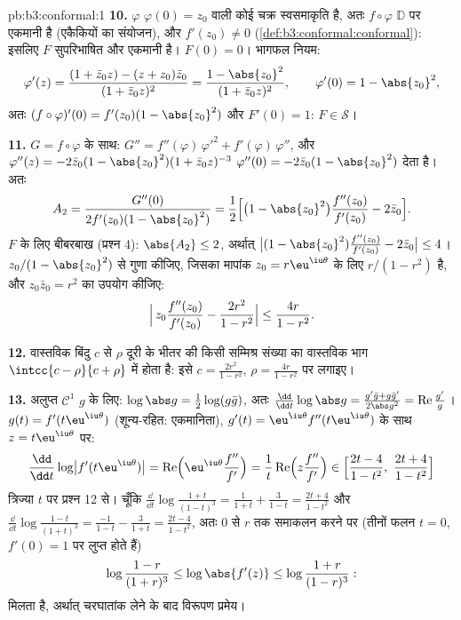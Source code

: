 \begin{solution}{pb:b3:conformal:1}
\textbf{10.} $\varphi$ $\varphi(0) = z_0$ वाली कोई चक्र स्वसमाकृति है, अतः $f\circ\varphi$
$\mathbb D$ पर एकमानी है (एकैकियों का संयोजन), और $f'(z_0) \neq
0$ (\cref{def:b3:conformal:conformal}): इसलिए
$F$ सुपरिभाषित और एकमानी है। $F(0) = 0$। भागफल नियम:
\[
\varphi'(z) = \frac{(1 + \bar z_0z) - (z + z_0)\bar z_0}
{(1 + \bar z_0z)^2}
= \frac{1 - \abs{z_0}^2}{(1 + \bar z_0z)^2},
\qquad \varphi'(0) = 1 - \abs{z_0}^2 ,
\]
अतः $(f\circ\varphi)'(0) = f'(z_0)(1 - \abs{z_0}^2)$ और $F'(0) = 1$: $F \in \mathcal S$।

\textbf{11.} $G = f\circ\varphi$ के साथ: $G'' =
f''(\varphi)\,\varphi'^2 + f'(\varphi)\,\varphi''$, और $\varphi''(z) = -2\bar z_0(1 - \abs{z_0}^2)(1 + \bar
z_0z)^{-3}$ $\varphi''(0) = -2\bar z_0(1 -
\abs{z_0}^2)$ देता है। अतः
\[
A_2 = \frac{G''(0)}{2f'(z_0)(1 - \abs{z_0}^2)}
= \frac12\Bigl[\bigl(1 - \abs{z_0}^2\bigr)
\frac{f''(z_0)}{f'(z_0)} - 2\bar z_0\Bigr] .
\]
$F$ के लिए बीबरबाख (प्रश्न 4): $\abs{A_2} \leq 2$, अर्थात् $\bigl|(1 - \abs{z_0}^2)\frac{f''(z_0)}{f'(z_0)} - 2\bar
z_0\bigr| \leq 4$। $z_0/(1 - \abs{z_0}^2)$ से गुणा
कीजिए, जिसका मापांक $z_0 = r\eu^{\iu\theta}$ के लिए $r/(1 - r^2)$ है, और $z_0\bar
z_0 = r^2$ का उपयोग कीजिए:
\[
\Bigl|\,z_0\frac{f''(z_0)}{f'(z_0)} -
\frac{2r^2}{1 - r^2}\Bigr| \leq \frac{4r}{1 - r^2} .
\]

\textbf{12.} वास्तविक बिंदु $c$ से $\rho$ दूरी के भीतर की किसी
सम्मिश्र संख्या का वास्तविक भाग $\intcc{c - \rho}{c +
\rho}$ में होता है: इसे $c = \frac{2r^2}{1-r^2}$, $\rho =
\frac{4r}{1-r^2}$
पर लगाइए।

\textbf{13.} अलुप्त $\mathcal C^1$ $g$ के लिए: $\log\abs g = \frac12\log(g\bar g)$, अतः $\frac{\dd}{\dd
t}\log\abs g = \frac{g'\bar g + g\bar g'}{2\abs g^2} =
\operatorname{Re}\frac{g'}g$। $g(t) =
f'(t\eu^{\iu\theta})$
(शून्य-रहित: एकमानिता), $g'(t) =
\eu^{\iu\theta}f''(t\eu^{\iu\theta})$ के साथ $z =
t\eu^{\iu\theta}$ पर:
\[
\frac{\dd}{\dd t}\log\bigl|f'(t\eu^{\iu\theta})\bigr|
= \operatorname{Re}\Bigl(\eu^{\iu\theta}
\frac{f''}{f'}\Bigr)
= \frac1t\operatorname{Re}\Bigl(z\frac{f''}{f'}\Bigr)
\in \Bigl[\frac{2t - 4}{1 - t^2},\
\frac{2t + 4}{1 - t^2}\Bigr]
\]
त्रिज्या $t$ पर प्रश्न 12 से। चूँकि $\frac{\dd}{\dd
t}\log\frac{1+t}{(1-t)^3} = \frac1{1+t} + \frac3{1-t} =
\frac{2t+4}{1-t^2}$ और $\frac{\dd}{\dd
t}\log\frac{1-t}{(1+t)^3} = \frac{-1}{1-t} - \frac3{1+t} =
\frac{2t-4}{1-t^2}$, अतः $0$ से
$r$ तक समाकलन करने पर (तीनों फलन $t = 0$, $f'(0) = 1$ पर लुप्त होते हैं)
\[
\log\frac{1-r}{(1+r)^3} \leq \log\abs{f'(z)} \leq
\log\frac{1+r}{(1-r)^3} :
\]
मिलता है, अर्थात् चरघातांक लेने के बाद विरूपण प्रमेय।


\end{solution}
